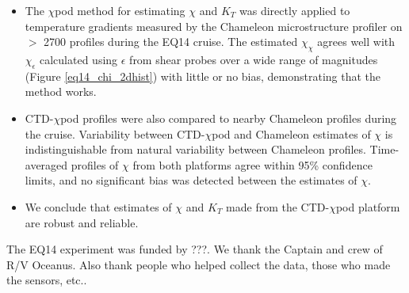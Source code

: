 \documentclass{ametsoc}
\begin{document}
\begin{itemize}
\item The $\chi$pod method for estimating $\chi$ and $K_T$ was directly applied to temperature gradients measured by the Chameleon microstructure profiler on $>$ 2700 profiles during the EQ14 cruise. The estimated $\chi_{\chi}$ agrees well with $\chi_{\epsilon}$ calculated using $\epsilon$ from shear probes over a wide range of magnitudes (Figure \ref{eq14_chi_2dhist}) with little or no bias, demonstrating that the method works.
\item CTD-$\chi$pod profiles were also compared to nearby Chameleon profiles during the cruise. Variability between CTD-$\chi$pod and Chameleon estimates of $\chi$ is indistinguishable from natural variability between Chameleon profiles. Time-averaged profiles of $\chi$ from both platforms agree within 95\% confidence limits, and no significant bias was detected between the estimates of $\chi$.
\item We conclude that estimates of $\chi$ and $K_T$ made from the CTD-$\chi$pod platform are robust and reliable.
\end{itemize}



%
\acknowledgments
The EQ14 experiment was funded by ???. We thank the Captain and crew of R/V Oceanus. Also thank people who helped collect the data, those who made the sensors, etc..


%


%
\end{document}
